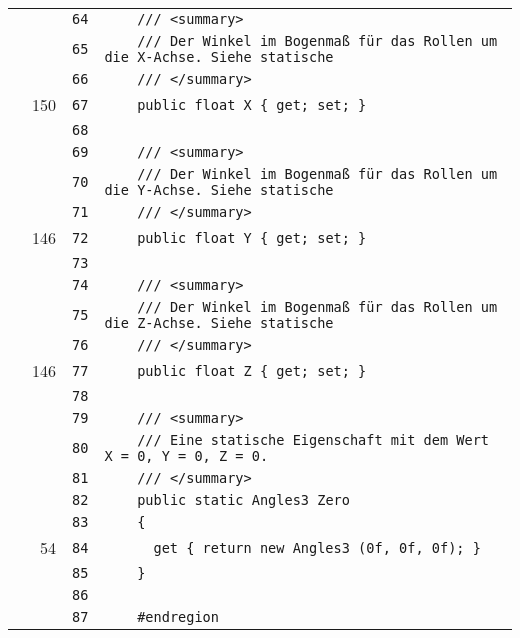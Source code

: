 \documentclass[a4paper,10pt]{article}
\begin{document}
\begin{longtable}[l]{lrrl}
\cellcolor{gray} &  & \verb~64~ & \verb~    /// <summary>~\\
\cellcolor{gray} &  & \verb~65~ & \verb~    /// Der Winkel im Bogenmaß für das Rollen um die X-Achse. Siehe statische ~\\
\cellcolor{gray} &  & \verb~66~ & \verb~    /// </summary>~\\
\cellcolor{green} & 150 & \verb~67~ & \verb~    public float X { get; set; }~\\
\cellcolor{gray} &  & \verb~68~ & \verb~~\\
\cellcolor{gray} &  & \verb~69~ & \verb~    /// <summary>~\\
\cellcolor{gray} &  & \verb~70~ & \verb~    /// Der Winkel im Bogenmaß für das Rollen um die Y-Achse. Siehe statische ~\\
\cellcolor{gray} &  & \verb~71~ & \verb~    /// </summary>~\\
\cellcolor{green} & 146 & \verb~72~ & \verb~    public float Y { get; set; }~\\
\cellcolor{gray} &  & \verb~73~ & \verb~~\\
\cellcolor{gray} &  & \verb~74~ & \verb~    /// <summary>~\\
\cellcolor{gray} &  & \verb~75~ & \verb~    /// Der Winkel im Bogenmaß für das Rollen um die Z-Achse. Siehe statische ~\\
\cellcolor{gray} &  & \verb~76~ & \verb~    /// </summary>~\\
\cellcolor{green} & 146 & \verb~77~ & \verb~    public float Z { get; set; }~\\
\cellcolor{gray} &  & \verb~78~ & \verb~~\\
\cellcolor{gray} &  & \verb~79~ & \verb~    /// <summary>~\\
\cellcolor{gray} &  & \verb~80~ & \verb~    /// Eine statische Eigenschaft mit dem Wert X = 0, Y = 0, Z = 0.~\\
\cellcolor{gray} &  & \verb~81~ & \verb~    /// </summary>~\\
\cellcolor{gray} &  & \verb~82~ & \verb~    public static Angles3 Zero~\\
\cellcolor{gray} &  & \verb~83~ & \verb~    {~\\
\cellcolor{green} & 54 & \verb~84~ & \verb~      get { return new Angles3 (0f, 0f, 0f); }~\\
\cellcolor{gray} &  & \verb~85~ & \verb~    }~\\
\cellcolor{gray} &  & \verb~86~ & \verb~~\\
\cellcolor{gray} &  & \verb~87~ & \verb~    #endregion~\\

\end{longtable}
\end{document}
